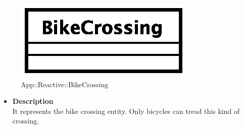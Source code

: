 \begin{figure}[h]
\centering
\includegraphics[scale=0.6,keepaspectratio]{images/solution/bike_crossing.eps}
\caption{App::Reactive::BikeCrossing}
\label{fig:sd-app-bike_crossing}
\end{figure}
\FloatBarrier
\begin{itemize}
  \item \textbf{Description} \\
    It represents the bike crossing entity. Only bicycles can tread this kind 
of crossing. 
\end{itemize}
